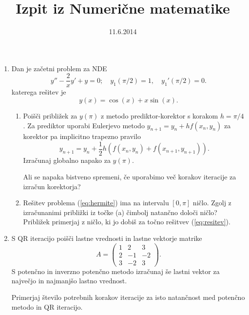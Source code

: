 \documentclass[slovene]{article}
\begin{document}
\title{Izpit iz Numerične matematike}


\date{11.6.2014}
\maketitle
\begin{enumerate}
\item Dan je začetni problem za NDE  
\begin{equation}
y''-\frac{2}{x}y'+y=0;\quad y_{1}(\pi/2)=1,\quad y_{1}'(\pi/2)=0.\label{eq:hermite}
\end{equation}
katerega rešitev je 
\begin{equation}
y(x)=\cos(x)+x\sin(x).\label{eq:resitev}
\end{equation} 
\begin{enumerate}
\item Poišči približek za $y(\pi)$ z metodo prediktor-korektor s korakom $h=\pi/4$.
Za prediktor uporabi Eulerjevo metodo $y_{n+1}=y_n +hf(x_n,y_n)$ za korektor pa 
implicitno trapezno pravilo
\begin{equation*}
y_{n+1}=y_n +\frac{1}{2}h\left(f(x_n,y_n)+f(x_{n+1},y_{n+1})\right).
\end{equation*}
Izračunaj globalno napako za $y(\pi)$.  

Ali se napaka bistveno spremeni, če uporabimo več korakov iteracije 
za izračun korektorja?
\item
Rešitev problema (\ref{eq:hermite}) ima na intervalu $[0,\pi]$ ničlo. 
Zgolj z izračunanimi približki iz točke (a) čimbolj natančno določi 
ničlo? Približek primerjaj z ničlo, ki jo dobiš za točno rešitvev 
(\ref{eq:resitev}).    
\end{enumerate}

\item S QR iteracijo poišči lastne vrednosti in lastne vektorje matrike
  \begin{equation}
    \label{eq:matrika}
    A= \begin{pmatrix}
      1 & 2 & 3\\
      2 & -1 & -2\\
      3 & -2 & 3
    \end{pmatrix}.
  \end{equation}
S potenčno in inverzno potenčno metodo izračunaj še lastni vektor za 
največjo in najmanjšo lastno vrednost.

Primerjaj število potrebnih korakov iteracije za isto 
natančnost med potenčno metodo in QR iteracijo. 
 \end{enumerate}
\end{document}
